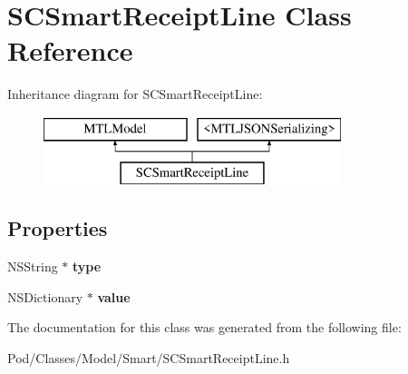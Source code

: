 \hypertarget{interface_s_c_smart_receipt_line}{}\section{S\+C\+Smart\+Receipt\+Line Class Reference}
\label{interface_s_c_smart_receipt_line}
Inheritance diagram for S\+C\+Smart\+Receipt\+Line\+:\begin{figure}[H]
\begin{center}
\leavevmode
\includegraphics[height=2.000000cm]{interface_s_c_smart_receipt_line}
\end{center}
\end{figure}
\subsection*{Properties}
\begin{DoxyCompactItemize}
\item 
N\+S\+String $\ast$ {\bfseries type}\hypertarget{interface_s_c_smart_receipt_line_aea7c95c08f8d1ed4cba5a9776276a472}{}\label{interface_s_c_smart_receipt_line_aea7c95c08f8d1ed4cba5a9776276a472}

\item 
N\+S\+Dictionary $\ast$ {\bfseries value}\hypertarget{interface_s_c_smart_receipt_line_a5a5eb913df6624c2a88255e7b88717b7}{}\label{interface_s_c_smart_receipt_line_a5a5eb913df6624c2a88255e7b88717b7}

\end{DoxyCompactItemize}


The documentation for this class was generated from the following file\+:\begin{DoxyCompactItemize}
\item 
Pod/\+Classes/\+Model/\+Smart/S\+C\+Smart\+Receipt\+Line.\+h\end{DoxyCompactItemize}
